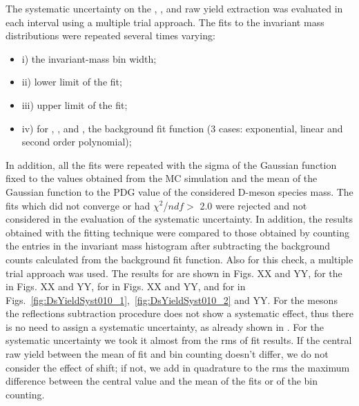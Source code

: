 The systematic uncertainty on the \Dplus, \Dzero, \Dstar and \Dsubs raw yield extraction was evaluated in each \pt interval using a multiple trial approach. The fits to the invariant mass distributions were repeated several times varying:
\begin{itemize}
	\item i) the invariant-mass bin width;
	\item ii) lower limit of the fit;
	\item iii)  upper  limit  of  the  fit;
	\item iv) for \Dzero, \Dplus, and \Dsubs, the background fit function (3 cases: exponential, linear and second order polynomial);
\end{itemize}   
In addition, all the fits were repeated with the sigma of the Gaussian function fixed to the values obtained from the MC simulation and the mean of the Gaussian function to the PDG value of the considered D-meson species mass. The fits which did not converge or had $\chi^2$/$ndf> $ 2.0 were rejected and not considered in the evaluation of the systematic uncertainty.  In addition, the results obtained with the fitting technique were compared to those obtained by counting the entries in the invariant mass histogram after subtracting the background counts calculated from the background fit function. Also for this check, a multiple trial approach was used. 
The results for \Dplus are shown in Figs. XX and YY, for the \Dzero in Figs. XX and YY, for \Dstar in Figs. XX and YY, and for \Dsubs in Figs.~\ref{fig:DsYieldSyst010_1},~\ref{fig:DsYieldSyst010_2} and YY.
For the \Dzero mesons the reflections subtraction procedure does not show a systematic effect, thus there is no need to assign a systematic uncertainty, as already shown in \cite{Bruna:2016mgn}. For the systematic uncertainty we took it almost from the rms of fit results. If the central raw yield between the mean of fit and bin counting doesn't differ, we do not consider the effect of shift; if not, we add in quadrature to the rms the maximum difference between the central value and the mean of the fits or of the bin counting.




